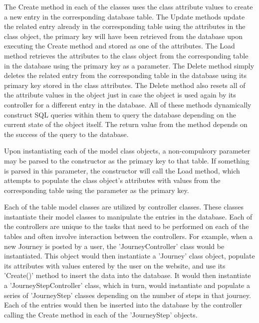 The Create method in each of the classes uses the class attribute values to create a new entry in the corresponding database table. The Update methods update the related entry already in the corresponding table using the attributes in the class object, the primary key will have been retrieved from the database upon executing the Create method and stored as one of the attributes. The Load method retrieves the attributes to the class object from the corresponding table in the database using the primary key as a parameter. The Delete method simply deletes the related entry from the corresponding table in the database using its primary key stored in the class attributes. The Delete method also resets all of the attribute values in the object just in case the object is used again by its controller for a different entry in the database. All of these methods dynamically construct SQL queries within them to query the database depending on the current state of the object itself. The return value from the method depends on the success of the query to the database.
		
		Upon instantiating each of the model class objects, a non-compulsory parameter may be parsed to the constructor as the primary key to that table. If something is parsed in this parameter, the constructor will call the Load method, which attempts to populate the class object's attributes with values from the corresponding table using the parameter as the primary key.
		
		Each of the table model classes are utilized by controller classes. These classes instantiate their model classes to manipulate the entries in the database. Each of the controllers are unique to the tasks that need to be performed on each of the tables and often involve interaction between the controllers. For example, when a new Journey is posted by a user, the 'Journey\textunderscore Controller' class would be instantiated. This object would then instantiate a 'Journey' class object, populate its attributes with values entered by the user on the website, and use its 'Create()' method to insert the data into the database. It would then instantiate a 'Journey\textunderscore Step\textunderscore Controller' class, which in turn, would instantiate and populate a series of 'Journey\textunderscore Step' classes depending on the number of steps in that journey. Each of the entries would then be inserted into the database by the controller calling the Create method in each of the 'Journey\textunderscore Step' objects. 	
				
